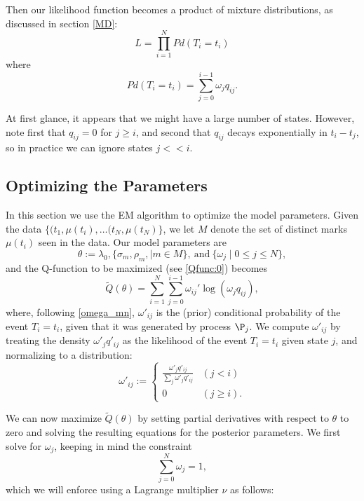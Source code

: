 \documentclass[12pt,leqno]{article}
\begin{document}
Then our likelihood function becomes a product of mixture distributions, as discussed in section \eqref{MD}:
$$
L = \prod_{i=1}^NPd(T_i = t_i)
$$
where 
\begin{equation}\label{likelihood}
    Pd(T_i = t_i) = \sum_{j=0}^{i-1}\omega_jq_{ij}.
\end{equation}

At first glance, it appears that we might have a large number of states.  However, note first that $q_{ij} = 0$ for $j \ge i$, and second that $q_{ij}$ decays exponentially in $t_i-t_j$, so in practice we can ignore states $j << i$.


\subsection{Optimizing the Parameters}
In this section we use the EM algorithm to optimize the model parameters.
Given the data $\{(t_1,\mu(t_i),\dots(t_N,\mu(t_N)\}$, we let $M$ denote the set of distinct marks $\mu(t_i)$
seen in the data.  Our model parameters are
$$
\theta := \lambda_0, \{\sigma_m, \rho_m, \mid m \in M\},~\text{and}~ \{\omega_j\mid 0\le j\le N\},
$$
and the Q-function to be maximized (see \eqref{Qfunc:0}) becomes
\begin{equation}\label{Q}
\tilde{Q}(\theta) = \sum_{i=1}^N\sum_{j=0}^{i-1}\omega_{ij}'\log(\omega_jq_{ij}),
\end{equation}
where, following \eqref{omega_mn}, $\omega'_{ij}$ is the (prior) conditional
probability of the event $T_i=t_i$,
given that it was generated by process $\P_j$.  We compute $\omega'_{ij}$ by
treating the density $\omega'_jq'_{ij}$ as the likelihood of the event $T_i = t_i$ given state $j$,
and normalizing to a distribution:
\begin{equation}\label{omega'_ij}
\omega'_{ij} :=
\begin{cases}
  \frac{\omega'_jq'_{ij}}{\sum_j\omega'_jq'_{ij}}&(j < i) \\
  0&(j \ge i).
\end{cases}
\end{equation}


We can now maximize $\tilde{Q}(\theta)$ by setting partial derivatives with respect to $\theta$ to
zero and solving the resulting equations for the posterior parameters.  We first solve for $\omega_j$, keeping in
mind the constraint
$$
\sum_{j=0}^N\omega_j = 1,
$$
which we will enforce using a Lagrange multiplier $\nu$ as follows:
\end{document}

